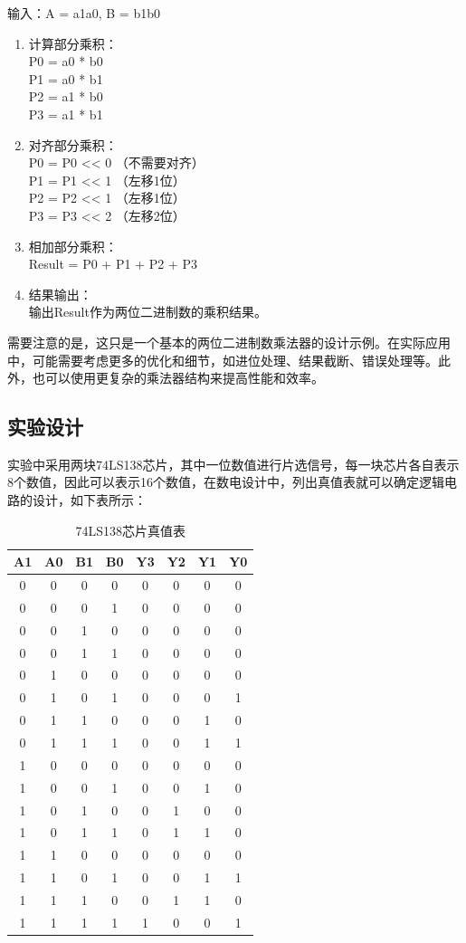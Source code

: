 \documentclass[UTF8,12pt]{article}
\begin{document}
输入：A = a1a0, B = b1b0

\begin{enumerate}
    \item 计算部分乘积：\\ P0 = a0 * b0\\ P1 = a0 * b1\\ P2 = a1 * b0\\ P3 = a1 * b1
    \item 对齐部分乘积：\\ P0 = P0 << 0 （不需要对齐）\\ P1 = P1 << 1 （左移1位）\\ P2 = P2 << 1 （左移1位）\\ P3 = P3 << 2 （左移2位）
    \item 相加部分乘积：\\ Result = P0 + P1 + P2 + P3
    \item 结果输出：\\ 输出Result作为两位二进制数的乘积结果。
\end{enumerate}

需要注意的是，这只是一个基本的两位二进制数乘法器的设计示例。在实际应用中，可能需要考虑更多的优化和细节，如进位处理、结果截断、错误处理等。此外，也可以使用更复杂的乘法器结构来提高性能和效率。

\newpage

\subsection{实验设计}
实验中采用两块74LS138芯片，其中一位数值进行片选信号，每一块芯片各自表示8个数值，因此可以表示16个数值，在数电设计中，列出真值表就可以确定逻辑电路的设计，如下表所示：

\begin{table}[htbp]
    \centering
    \caption{74LS138芯片真值表}
    \begin{tabular}{|c|c|c|c|c|c|c|c|}
        \hline
        A1 & A0 & B1 & B0 & Y3 & Y2 & Y1 & Y0 \\
        \hline
        0&0&0&0&0&0&0&0 \\
        0&0&0&1&0&0&0&0 \\
        0&0&1&0&0&0&0&0 \\
        0&0&1&1&0&0&0&0 \\
        0&1&0&0&0&0&0&0 \\
        0&1&0&1&0&0&0&1 \\
        0&1&1&0&0&0&1&0 \\
        0&1&1&1&0&0&1&1 \\
        1&0&0&0&0&0&0&0 \\
        1&0&0&1&0&0&1&0 \\
        1&0&1&0&0&1&0&0 \\
        1&0&1&1&0&1&1&0 \\
        1&1&0&0&0&0&0&0 \\
        1&1&0&1&0&0&1&1 \\
        1&1&1&0&0&1&1&0 \\
        1&1&1&1&1&0&0&1 \\
        \hline
    \end{tabular}
\end{table}
\end{document}
